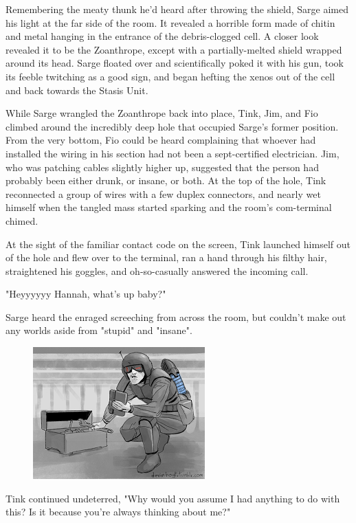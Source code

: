 Remembering the meaty thunk he'd heard after throwing the shield, Sarge aimed his light at the far side of the room. 
It revealed a horrible form made of chitin and metal hanging in the entrance of the debris-clogged cell. 
A closer look revealed it to be the Zoanthrope, except with a partially-melted shield wrapped around its head. 
Sarge floated over and scientifically poked it with his gun, took its feeble twitching as a good sign, and began hefting the xenos out of the cell and back towards the Stasis Unit.

While Sarge wrangled the Zoanthrope back into place, Tink, Jim, and Fio climbed around the incredibly deep hole that occupied Sarge's former position. 
From the very bottom, Fio could be heard complaining that whoever had installed the wiring in his section had not been a sept-certified electrician. 
Jim, who was patching cables slightly higher up, suggested that the person had probably been either drunk, or insane, or both. 
At the top of the hole, Tink reconnected a group of wires with a few duplex connectors, and nearly wet himself when the tangled mass started sparking and the room's com-terminal chimed.

At the sight of the familiar contact code on the screen, Tink launched himself out of the hole and flew over to the terminal, ran a hand through his filthy hair, straightened his goggles, and oh-so-casually answered the incoming call. 


"Heyyyyyy Hannah, what's up baby?"

Sarge heard the enraged screeching from across the room, but couldn't make out any worlds aside from "stupid" and "insane".

\begin{figure}
	\begin{center}
		\includegraphics[width=\figwidth]{pics/13/10.png}
	\end{center}
\end{figure}
Tink continued undeterred, "Why would you assume I had anything to do with this? 
Is it because you're always thinking about me?" 

